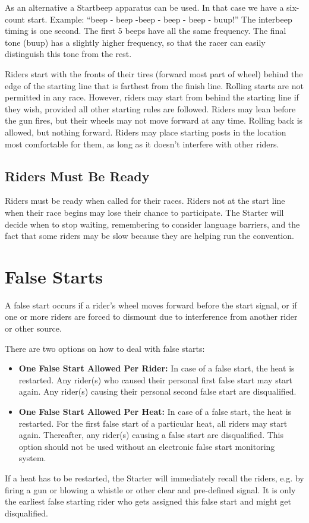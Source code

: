 As an alternative a Startbeep apparatus can be used.
In that case we have a six-count start.
Example: ``beep - beep -beep - beep - beep - buup!'' The interbeep timing is one second.
The first 5 beeps have all the same frequency.
The final tone (buup) has a slightly higher frequency, so that the racer can easily distinguish this tone from the rest.

Riders start with the fronts of their tires (forward most part of wheel) behind the edge of the starting line that is farthest from the finish line.
Rolling starts are not permitted in any race.
However, riders may start from behind the starting line if they wish, provided all other starting rules are followed.
Riders may lean before the gun fires, but their wheels may not move forward at any time.
Rolling back is allowed, but nothing forward.
Riders may place starting posts in the location most comfortable for them, as long as it doesn't interfere with other riders.

\subsection{Riders Must Be Ready}
Riders must be ready when called for their races.
Riders not at the start line when their race begins may lose their chance to participate.
The Starter will decide when to stop waiting, remembering to consider language barriers, and the fact that some riders may be slow because they are helping run the convention.

\section{False Starts}
A false start occurs if a rider's wheel moves forward before the start signal, or if one or more riders are forced to dismount due to interference from another rider or other source.

There are two options on how to deal with false starts:
\begin{itemize}
\item \textbf{One False Start Allowed Per Rider:}
In case of a false start, the heat is restarted.
Any rider(s) who caused their personal first false start may start again.
Any rider(s) causing their personal second false start are disqualified.
\item \textbf{One False Start Allowed Per Heat:} 
In case of a false start, the heat is restarted.
For the first false start of a particular heat, all riders may start again.
Thereafter, any rider(s) causing a false start are disqualified.
This option should not be used without an electronic false start monitoring system.
\end{itemize}
If a heat has to be restarted, the Starter will immediately recall the riders, e.g. by firing a gun or blowing a whistle or other clear and pre-defined signal.
It is only the earliest false starting rider who gets assigned this false start and might get disqualified.

